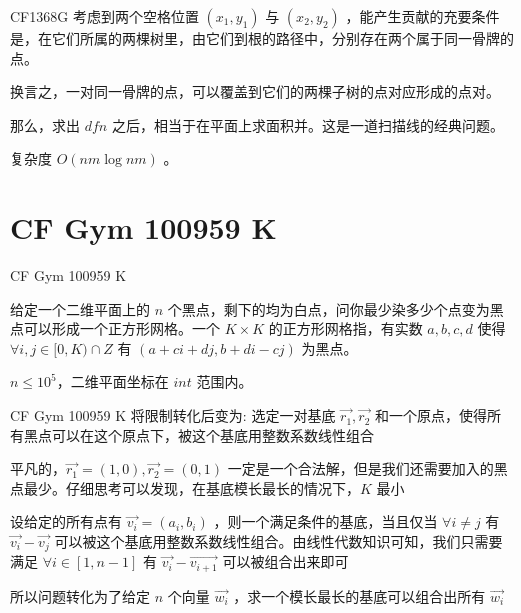 \documentclass[9pt]{beamer}
\begin{document}
  \begin{frame}{CF1368G}
     考虑到两个空格位置 $(x_1,y_1)$ 与 $(x_2,y_2)$ ，能产生贡献的充要条件是，在它们所属的两棵树里，由它们到根的路径中，分别存在两个属于同一骨牌的点。
  
     换言之，一对同一骨牌的点，可以覆盖到它们的两棵子树的点对应形成的点对。

     那么，求出 $dfn$ 之后，相当于在平面上求面积并。这是一道扫描线的经典问题。

     复杂度 $O(nm\log nm)$ 。
  \end{frame}

  \section{CF Gym 100959 K}
  \begin{frame}{CF Gym 100959 K}
    \par 给定一个二维平面上的 $n$ 个黑点，剩下的均为白点，问你最少染多少个点变为黑点可以形成一个正方形网格。一个 $K\times K$ 的正方形网格指，有实数 $a,b,c,d$ 使得 $\forall i,j\in[0,K)\cap Z$ 有 $(a+ci+dj,b+di-cj)$ 为黑点。 
    \par $n\leq 10^5$，二维平面坐标在 $int$ 范围内。
  \end{frame}

  \begin{frame}{CF Gym 100959 K}
     将限制转化后变为: 选定一对基底 $\vec{r_1}, \vec{r_2}$ 和一个原点，使得所有黑点可以在这个原点下，被这个基底用整数系数线性组合

     平凡的，$\vec{r_1}=(1,0),\vec{r_2}=(0,1)$ 一定是一个合法解，但是我们还需要加入的黑点最少。仔细思考可以发现，在基底模长最长的情况下，$K$ 最小
  
     设给定的所有点有 $\vec{v_i}=(a_i,b_i)$ ，则一个满足条件的基底，当且仅当 $\forall i\not= j$ 有 $\vec{v_i}-\vec{v_j}$ 可以被这个基底用整数系数线性组合。由线性代数知识可知，我们只需要满足 $\forall i\in[1,n-1]$ 有 $\vec{v_i}-\vec{v_{i+1}}$ 可以被组合出来即可

     所以问题转化为了给定 $n$ 个向量 $\vec{w_i}$ ，求一个模长最长的基底可以组合出所有 $\vec{w_i}$ 
  \end{frame}
\end{document}
